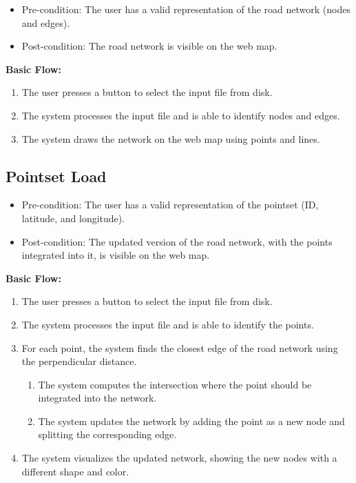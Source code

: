 \documentclass[11pt]{article}
\begin{document}
\begin{itemize}
    \item Pre-condition: The user has a valid representation of the road network (nodes and edges).
    \item Post-condition: The road network is visible on the web map.
\end{itemize}

\textbf{Basic Flow:}
\begin{enumerate}
    \item The user presses a button to select the input file from disk.
    \item The system processes the input file and is able to identify nodes and edges.
    \item The system draws the network on the web map using points and lines.
\end{enumerate}

\subsection{Pointset Load}

\begin{itemize}
    \item Pre-condition: The user has a valid representation of the pointset (ID, latitude, and longitude).
    \item Post-condition: The updated version of the road network, with the points integrated into it, is visible on the web map.
\end{itemize}

\textbf{Basic Flow:}
\begin{enumerate}
    \item The user presses a button to select the input file from disk.
    \item The system processes the input file and is able to identify the points.
    \item For each point, the system finds the closest edge of the road network using the perpendicular distance.
    \begin{enumerate}
        \item The system computes the intersection where the point should be integrated into the network.
        \item The system updates the network by adding the point as a new node and splitting the corresponding edge.
    \end{enumerate}
    \item The system visualizes the updated network, showing the new nodes with a different shape and color.
\end{enumerate}
\end{document}
